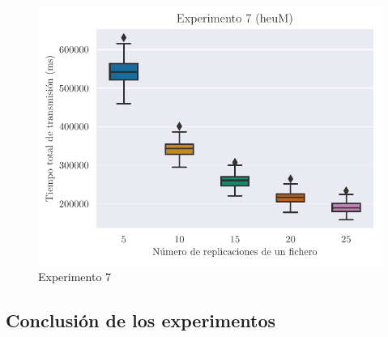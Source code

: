 \begin{figure}[H]
    \centering
    \includegraphics{include/plots/ex7_ttt_bplot.pdf}
    \caption{Experimento 7}%
    \label{fig:ex7ttt}
\end{figure}

\subsection{Conclusión de los experimentos}
    
    
    
